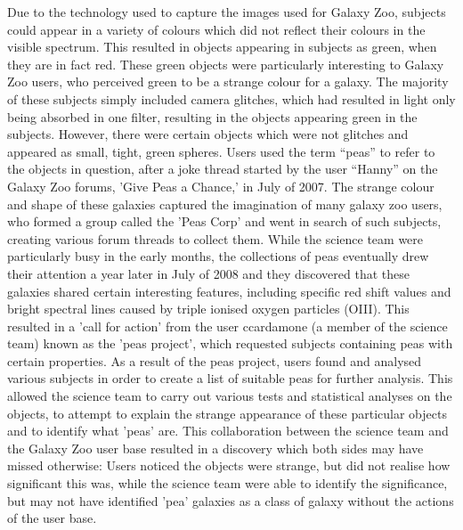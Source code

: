 \documentclass{sigchi}
\begin{document}

Due to the technology used to capture the images used for Galaxy Zoo, subjects could appear in a variety of colours which did not reflect their colours in the visible spectrum. This resulted in objects appearing in subjects as green, when they are in fact red. These green objects were particularly interesting to Galaxy Zoo users, who perceived green to be a strange colour for a galaxy.
The majority of these subjects simply included camera glitches, which had resulted in light only being absorbed in one filter, resulting in the objects appearing green in the subjects. However, there were certain objects which were not glitches and appeared as small, tight, green spheres. Users used the term “peas” to refer to the objects in question, after a joke thread started by the user “Hanny” on the Galaxy Zoo forums, 'Give Peas a Chance,' in July of 2007.
The strange colour and shape of these galaxies captured the imagination of many galaxy zoo  users, who formed a group called the 'Peas Corp' and went in search of such subjects, creating various forum threads to collect them. While the science team were particularly busy in the early months, the collections of peas eventually drew their attention a year later in July of 2008 and they discovered that these galaxies shared  certain interesting features, including specific red shift values and bright spectral lines caused by triple ionised oxygen particles (OIII). This resulted in a 'call for action' from the user ccardamone (a member of the science team) known as the 'peas project', which requested subjects containing peas with certain properties.
As a result of the peas project, users found and analysed various subjects in order to create a list of suitable peas for further analysis. This allowed the science team to carry out various tests and statistical analyses on the objects, to attempt to explain the strange appearance of these particular objects and to identify what 'peas' are. This collaboration between the science team and the Galaxy Zoo user base resulted in a discovery which both sides may have missed otherwise: Users noticed the objects were strange, but did not realise how significant this was, while the science team were able to identify the significance, but may not have identified 'pea' galaxies as a class of galaxy without the actions of the user base.

\end{document}
